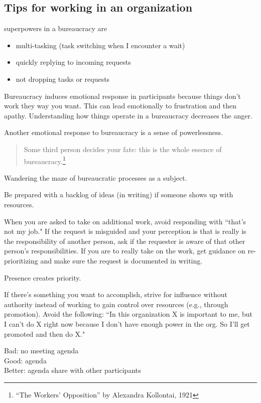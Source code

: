\subsection{Tips for working in an organization}

superpowers in a bureaucracy are
\begin{itemize}
    \item multi-tasking (task switching when I encounter a wait)
    \item quickly replying to incoming requests
    \item not dropping tasks or requests
\end{itemize}

Bureaucracy induces emotional response in participants because things don't work they way you want. This can lead emotionally to frustration and then apathy. Understanding how things operate in a bureaucracy decreases the anger.

Another emotional response to bureaucracy is a sense of powerlessness. 
\begin{quote}
Some third person decides your fate: this is the whole essence of bureaucracy.\footnote{``The Workers' Opposition'' by Alexandra Kollontai, 1921}
\end{quote}

Wandering the maze of bureaucratic processes as a subject.

Be prepared with a backlog of ideas (in writing) if someone shows up with resources.

When you are asked to take on additional work, avoid responding with ``that's not my job." If the request is misguided and your perception is that is really is the responsibility of another person, ask if the requester is aware of that other person's responsibilities. If you are to really take on the work, get guidance on re-prioritizing and make sure the request is documented in writing. 

Presence creates priority.

If there's something you want to accomplish, strive for influence without authority instead of working to gain control over resources (e.g., through promotion). Avoid the following: ``In this organization X is important to me, but I can't do X right now because I don't have enough power in the org. So I'll get promoted and then do X."


Bad: no meeting agenda\\
Good: agenda\\
Better: agenda share with other participants

